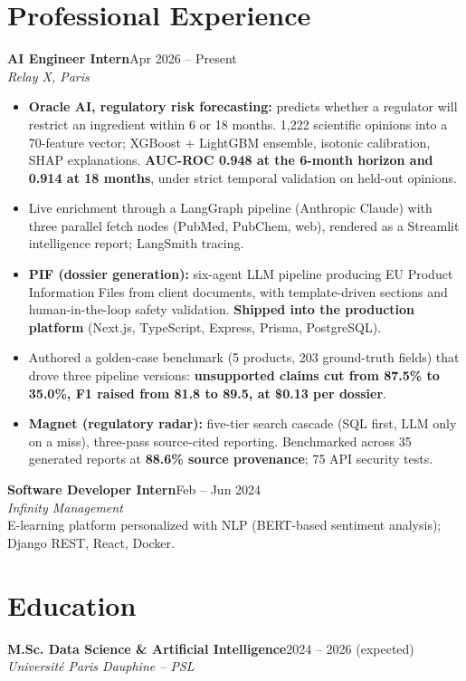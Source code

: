 \documentclass[9.5pt,a4paper]{article}
\newcommand{\jobtitle}[3]{\textbf{#1}\hfill{\small #2}\\[1pt]\textit{#3}}
\begin{document}
\section*{Professional Experience}

\jobtitle{AI Engineer Intern}{Apr 2026 -- Present}{Relay X, Paris}

\begin{itemize}
\item \textbf{Oracle AI, regulatory risk forecasting:} predicts whether a regulator will restrict an ingredient within 6 or 18 months. 1{,}222 scientific opinions into a 70-feature vector; XGBoost + LightGBM ensemble, isotonic calibration, SHAP explanations. \textbf{AUC-ROC 0.948 at the 6-month horizon and 0.914 at 18 months}, under strict temporal validation on held-out opinions.
\item Live enrichment through a LangGraph pipeline (Anthropic Claude) with three parallel fetch nodes (PubMed, PubChem, web), rendered as a Streamlit intelligence report; LangSmith tracing.
\item \textbf{PIF (dossier generation):} six-agent LLM pipeline producing EU Product Information Files from client documents, with template-driven sections and human-in-the-loop safety validation. \textbf{Shipped into the production platform} (Next.js, TypeScript, Express, Prisma, PostgreSQL).
\item Authored a golden-case benchmark (5 products, 203 ground-truth fields) that drove three pipeline versions: \textbf{unsupported claims cut from 87.5\% to 35.0\%, F1 raised from 81.8 to 89.5, at \$0.13 per dossier}.
\item \textbf{Magnet (regulatory radar):} five-tier search cascade (SQL first, LLM only on a miss), three-pass source-cited reporting. Benchmarked across 35 generated reports at \textbf{88.6\% source provenance}; 75 API security tests.
\end{itemize}

\vspace{1.8mm}
\jobtitle{Software Developer Intern}{Feb -- Jun 2024}{Infinity Management}\\[2pt]
E-learning platform personalized with NLP (BERT-based sentiment analysis); Django REST, React, Docker.

\section*{Education}
\jobtitle{M.Sc. Data Science \& Artificial Intelligence}{2024 -- 2026 (expected)}{Universit\'e Paris Dauphine -- PSL}
\end{document}
